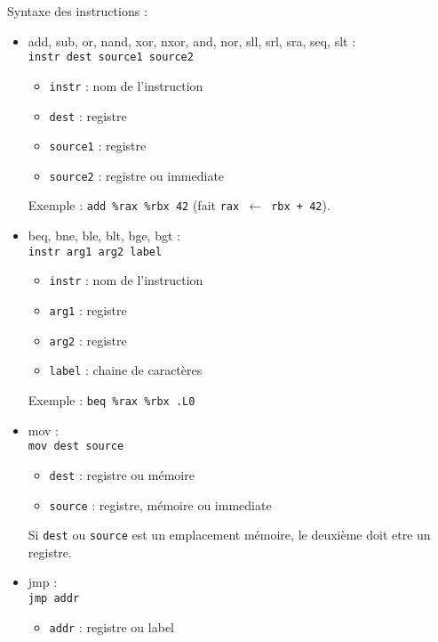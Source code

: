 \documentclass[a4paper]{article}
\begin{document}
    Syntaxe des instructions :
    \begin{itemize}
        \item add, sub, or, nand, xor, nxor, and, nor, sll, srl, sra, seq, slt :\\
        \texttt{instr dest source1 source2}
        \begin{itemize}
            \item \texttt{instr} : nom de l'instruction
            \item \texttt{dest} : registre
            \item \texttt{source1} : registre
            \item \texttt{source2} : registre ou immediate
        \end{itemize}
        Exemple : \texttt{add \%rax \%rbx 42} 
        (fait \texttt{rax $\leftarrow$ rbx + 42}).
        
        \item beq, bne, ble, blt, bge, bgt :\\
        \texttt{instr arg1 arg2 label}
        \begin{itemize}
            \item \texttt{instr} : nom de l'instruction
            \item \texttt{arg1} : registre
            \item \texttt{arg2} : registre
            \item \texttt{label} : chaine de caractères 
        \end{itemize}
        Exemple : \texttt{beq \%rax \%rbx .L0} 
        
        \item mov :\\
        \texttt{mov dest source}
        \begin{itemize}
            \item \texttt{dest} : registre ou mémoire
            \item \texttt{source} : registre, mémoire ou immediate
        \end{itemize}
        Si \texttt{dest} ou \texttt{source} est un emplacement mémoire, le deuxième doit etre un registre.

        \item jmp :\\
        \texttt{jmp addr}
        \begin{itemize}
            \item \texttt{addr} : registre ou label
        \end{itemize}


\end{itemize}
\end{document}

